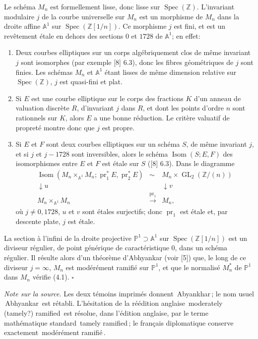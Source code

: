 \documentclass[10pt]{article}
\newcommand{\Z}{\mathbb Z}
\newcommand{\GL}{\operatorname{GL}}
\newcommand{\Isom}{\operatorname{Isom}}
\newcommand{\Spec}{\operatorname{Spec}}
\newcommand{\QED}{\hfill$\square$}
\newcommand{\frquote}[1]{\guillemotleft{}\,#1\,\guillemotright{}}
\begin{document}
Le schéma $M_n$ est formellement lisse, donc lisse sur $\Spec(\Z)$. L'invariant modulaire $j$ de la courbe universelle sur $M_n$ est un morphisme de $M_n$ dans la droite affine $\mathbb A^1$ sur $\Spec(\Z[1/n])$. Ce morphisme $j$ est fini, et est un revêtement étale en dehors des sections $0$ et $1728$ de $\mathbb A^1$; en effet:
\begin{enumerate}[label=(\alph*)]
\item Deux courbes elliptiques sur un corps algébriquement clos de même invariant $j$ sont isomorphes (par exemple [8] 6.3), donc les fibres géométriques de $j$ sont finies. Les schémas $M_n$ et $\mathbb A^1$ étant lisses de même dimension relative sur $\Spec(\Z)$, $j$ est quasi-fini et plat.
\item Si $E$ est une courbe elliptique sur le corps des fractions $K$ d'un anneau de valuation discrète $R$, d'invariant $j$ dans $R$, et dont les points d'ordre $n$ sont rationnels sur $K$, alors $E$ a une bonne réduction. Le critère valuatif de propreté montre donc que $j$ est propre.
\item Si $E$ et $F$ sont deux courbes elliptiques sur un schéma $S$, de même invariant $j$, et si $j$ et $j-1728$ sont inversibles, alors le schéma $\Isom(S;E,F)$ des isomorphismes entre $E$ et $F$ est étale sur $S$ ([8] 6.3). Dans le diagramme
\[
\begin{array}{ccc}
\Isom(M_n\times_{\mathbb A^1}M_n;\operatorname{pr}_1^*E,\operatorname{pr}_2^*E) & \sim & M_n\times\GL_2(\Z/(n))\\
\downarrow u && \downarrow v\\
M_n\times_{\mathbb A^1}M_n&\xrightarrow{\operatorname{pr}_1}&M_n,
\end{array}
\]
où $j\ne0,1728$, $u$ et $v$ sont étales surjectifs; donc $\operatorname{pr}_1$ est étale et, par descente plate, $j$ est étale.
\end{enumerate}
La section à l'infini de la droite projective $\mathbb P^1\supset\mathbb A^1$ sur $\Spec(\Z[1/n])$ est un diviseur régulier, de point générique de caractéristique $0$, dans un schéma régulier. Il résulte alors d'un théorème d'Abhyankar (voir [5]) que, le long de ce diviseur $j=\infty$, $M_n$ est modérément ramifié sur $\mathbb P^1$, et que le normalisé $M_n^*$ de $\mathbb P^1$ dans $M_n$ vérifie (4.1). \QED

\noindent\emph{Note sur la source.} Les deux témoins imprimés donnent \frquote{Abyankhar}; le nom usuel \frquote{Abhyankar} est rétabli. L'hésitation de la réédition anglaise \frquote{moderately (tamely?) ramified} est résolue, dans l'édition anglaise, par le terme mathématique standard \frquote{tamely ramified}; le français diplomatique conserve exactement \frquote{modérément ramifié}.
\end{document}
